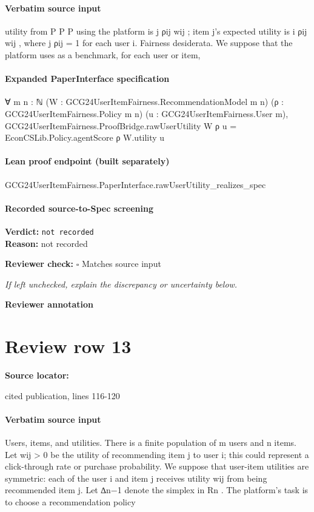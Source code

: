 \documentclass[10pt]{article}
\newcommand{\reviewerbox}{%
  \par\noindent\fbox{\parbox{0.96\linewidth}{\rule{0pt}{0.38in}}}\par
}
\newcommand{\reviewmatch}[1]{%
  \par\noindent\textbf{Reviewer check:} $\square$\; #1\par
  \noindent\emph{If left unchecked, explain the discrepancy or uncertainty below.}\par
}
\begin{document}
\paragraph{Verbatim source input}
\begin{ReviewVerbatim}
utility from
P
P
P
using the platform is j ρij wij ; item j’s expected utility is i ρij wij , where j ρij = 1 for each
user i.
Fairness desiderata. We suppose that the platform uses as a benchmark, for each user or item,
\end{ReviewVerbatim}


\paragraph{Expanded PaperInterface specification}
\begin{ReviewVerbatim}
∀ {m n : ℕ} (W : GCG24UserItemFairness.RecommendationModel m n) (ρ : GCG24UserItemFairness.Policy m n)
  (u : GCG24UserItemFairness.User m),
  GCG24UserItemFairness.ProofBridge.rawUserUtility W ρ u = EconCSLib.Policy.agentScore ρ W.utility u
\end{ReviewVerbatim}

\paragraph{Lean proof endpoint (built separately)}\begin{ReviewVerbatim}
GCG24UserItemFairness.PaperInterface.rawUserUtility_realizes_spec
\end{ReviewVerbatim}

\paragraph{Recorded source-to-Spec screening}
\textbf{Verdict:} \texttt{not recorded}
\\
\textbf{Reason:} not recorded
\reviewmatch{Matches source input}
\noindent\textbf{Reviewer annotation}\par
\reviewerbox
\clearpage
\hypertarget{source-claim-9f0be6e1ade7a30d}{}
\section*{Review row 13}
\textbf{Source locator:} {\footnotesize\raggedright cited publication, lines 116-\allowbreak{}120\par}
\paragraph{Verbatim source input}
\begin{ReviewVerbatim}
Users, items, and utilities. There is a finite population of m users and n items. Let wij > 0 be
the utility of recommending item j to user i; this could represent a click-through rate or purchase
probability. We suppose that user-item utilities are symmetric: each of the user i and item j receives
utility wij from being recommended item j.
Let ∆n−1 denote the simplex in Rn . The platform’s task is to choose a recommendation policy
\end{ReviewVerbatim}
\end{document}
